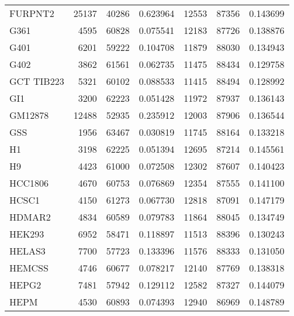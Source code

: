 \begin{tabular}{lrrrrrr}
                              FURPNT2 &     25137 &    40286 &  0.623964 &     12553 &    87356 &  0.143699 \\
                                 G361 &      4595 &    60828 &  0.075541 &     12183 &    87726 &  0.138876 \\
                                 G401 &      6201 &    59222 &  0.104708 &     11879 &    88030 &  0.134943 \\
                                 G402 &      3862 &    61561 &  0.062735 &     11475 &    88434 &  0.129758 \\
                           GCT TIB223 &      5321 &    60102 &  0.088533 &     11415 &    88494 &  0.128992 \\
                                  GI1 &      3200 &    62223 &  0.051428 &     11972 &    87937 &  0.136143 \\
                              GM12878 &     12488 &    52935 &  0.235912 &     12003 &    87906 &  0.136544 \\
                                  GSS &      1956 &    63467 &  0.030819 &     11745 &    88164 &  0.133218 \\
                                   H1 &      3198 &    62225 &  0.051394 &     12695 &    87214 &  0.145561 \\
                                   H9 &      4423 &    61000 &  0.072508 &     12302 &    87607 &  0.140423 \\
                              HCC1806 &      4670 &    60753 &  0.076869 &     12354 &    87555 &  0.141100 \\
                                HCSC1 &      4150 &    61273 &  0.067730 &     12818 &    87091 &  0.147179 \\
                               HDMAR2 &      4834 &    60589 &  0.079783 &     11864 &    88045 &  0.134749 \\
                               HEK293 &      6952 &    58471 &  0.118897 &     11513 &    88396 &  0.130243 \\
                               HELAS3 &      7700 &    57723 &  0.133396 &     11576 &    88333 &  0.131050 \\
                               HEMCSS &      4746 &    60677 &  0.078217 &     12140 &    87769 &  0.138318 \\
                                HEPG2 &      7481 &    57942 &  0.129112 &     12582 &    87327 &  0.144079 \\
                                 HEPM &      4530 &    60893 &  0.074393 &     12940 &    86969 &  0.148789 \\

\end{tabular}
